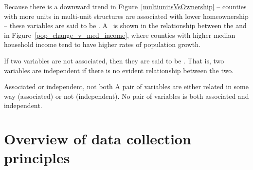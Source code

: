 Because there is a downward trend in
Figure~\ref{multiunitsVsOwnership} --
counties with more units in multi-unit structures
are associated with lower homeownership --
these variables are said to be
.
A~ is shown in the relationship
between the
and 
in Figure~\ref{pop_change_v_med_income},
where counties with higher median household income tend
to have higher rates of population growth.



If two variables are not associated,
then they are said to be .
That is, two variables are independent if there
is no evident relationship between the two.

\begin{onebox}{Associated or independent, not both}
A pair of variables are either related in some way (associated) or not (independent). No pair of variables is both associated and independent.
\end{onebox}



\section{Overview of data collection principles}
\label{overviewOfDataCollectionPrinciples}



